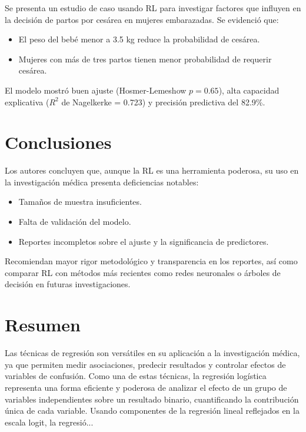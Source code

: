 \documentclass[12pt]{article}
\begin{document}
Se presenta un estudio de caso usando RL para investigar factores que influyen en la decisi\'on de partos por ces\'area en mujeres embarazadas. Se evidenci\'o que:
\begin{itemize}
  \item El peso del beb\'e menor a 3.5 kg reduce la probabilidad de ces\'area.
  \item Mujeres con m\'as de tres partos tienen menor probabilidad de requerir ces\'area.
\end{itemize}

El modelo mostr\'o buen ajuste (Hosmer-Lemeshow $p = 0.65$), alta capacidad explicativa ($R^2$ de Nagelkerke = 0.723) y precisi\'on predictiva del 82.9\%.

\section*{Conclusiones}

Los autores concluyen que, aunque la RL es una herramienta poderosa, su uso en la investigaci\'on m\'edica presenta deficiencias notables:
\begin{itemize}
  \item Tama\~nos de muestra insuficientes.
  \item Falta de validaci\'on del modelo.
  \item Reportes incompletos sobre el ajuste y la significancia de predictores.
\end{itemize}

Recomiendan mayor rigor metodol\'ogico y transparencia en los reportes, as\'i como comparar RL con m\'etodos m\'as recientes como redes neuronales o \'arboles de decisi\'on en futuras investigaciones.



\section*{Resumen}

Las técnicas de regresión son versátiles en su aplicación a la investigación médica, ya que permiten medir asociaciones, predecir resultados y controlar efectos de variables de confusión. Como una de estas técnicas, la regresión logística representa una forma eficiente y poderosa de analizar el efecto de un grupo de variables independientes sobre un resultado binario, cuantificando la contribución única de cada variable. Usando componentes de la regresión lineal reflejados en la escala logit, la regresió...
\end{document}
